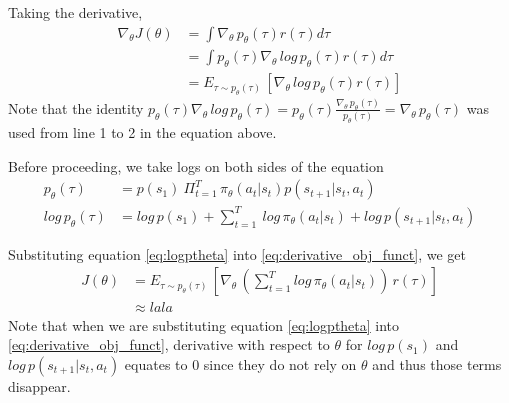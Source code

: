 \documentclass[11pt]{article} %
\begin{document}
Taking the derivative,
\begin{equation}\label{eq:derivative_obj_funct}
\begin{split}
    \nabla_\theta J(\theta) &= \int \nabla_\theta\, p_\theta(\tau)r(\tau)d\tau \\
    &= \int p_\theta(\tau) \nabla_\theta\, log\, p_\theta (\tau) r(\tau) d\tau \\
    &= E_{\tau \sim p_\theta(\tau)}\,[\nabla_\theta\, log\, p_\theta(\tau)r(\tau)]
\end{split}
\end{equation}
Note that the identity $p_\theta(\tau) \nabla_\theta\, log\, p_\theta (\tau) = p_\theta(\tau) \frac{\nabla_\theta\, p_\theta(\tau)}{p_\theta(\tau)} = \nabla_\theta\, p_\theta(\tau)$ was used from line 1 to 2 in the equation above.

Before proceeding, we take logs on both sides of the equation 
\begin{equation}\label{eq:logptheta}
\begin{split}
    p_\theta(\tau) &= p(s_1)\: \Pi^T_{t=1}\,\pi_\theta(a_t|s_t)p(s_{t+1}|s_t, a_t) \\ log\, p_\theta(\tau) &= log\, p(s_1) + \sum_{t=1}^T\: log\,\pi_\theta(a_t|s_t) + log\, p(s_{t+1}|s_t, a_t) 
\end{split}
\end{equation}

Substituting equation \ref{eq:logptheta} into \ref{eq:derivative_obj_funct}, we get \begin{equation*}
\begin{split}
    J(\theta) &= E_{\tau \sim p_\theta(\tau)}\,[\nabla_\theta\, (\sum_{t=1}^T log\,\pi_\theta(a_t|s_t))\,r(\tau)] \\
    &\approx lala 
\end{split}
\end{equation*}
Note that when we are substituting equation \ref{eq:logptheta} into \ref{eq:derivative_obj_funct}, derivative with respect to $\theta$ for $log\, p(s_1)$ and $log\, p(s_{t+1}|s_t, a_t)$ equates to 0 since they do not rely on $\theta$ and thus those terms disappear. 
\newpage


\end{document}
